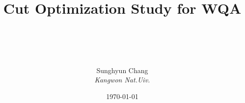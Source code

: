 \documentclass[xcolor=x11names,compress]{beamer}
\renewcommand{\(}{\begin{columns}}
\renewcommand{\)}{\end{columns}}
\newcommand{\<}[1]{\begin{column}{#1}}
\renewcommand{\>}{\end{column}}
\begin{document}
\begin{frame}
\title{Cut Optimization Study for WQA}

\author{~\\ ~\\ ~\\ ~\\
	Sunghyun Chang\\
	{\it Kangwon Nat.Uiv.}
}
\date{
	\today
}
\titlepage
\end{frame}




\end{document}
